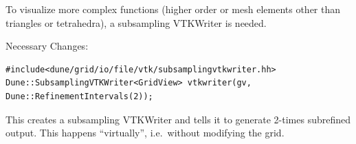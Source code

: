 \documentclass[ignorenonframetext,11pt]{beamer}
\theoremstyle{definition}
\begin{document}
\begin{frame}
\framebreak

To visualize more complex functions (higher order or mesh elements other than
triangles or tetrahedra), a subsampling VTKWriter is needed.

Necessary Changes:

\begin{lstlisting}[numbers=none,basicstyle=\scriptsize\ttfamily]
#include<dune/grid/io/file/vtk/subsamplingvtkwriter.hh>
Dune::SubsamplingVTKWriter<GridView> vtkwriter(gv, Dune::RefinementIntervals(2));
\end{lstlisting}

This creates a subsampling VTKWriter and tells it to generate 2-times
subrefined output. %
This happens ``virtually'', i.e.\ without modifying the grid.
\end{frame}

\end{document}
